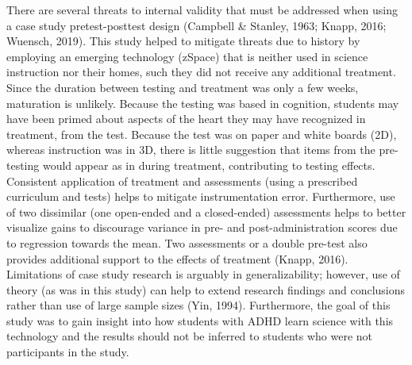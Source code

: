 \documentclass[11.5pt]{sig-alternate} %
\begin{document}
\begin{large}
There are several threats to internal validity that must be addressed when using a case study pretest-posttest design (Campbell \& Stanley, 1963; Knapp, 2016; Wuensch, 2019). This study helped to mitigate threats due to history by employing an emerging technology (zSpace) that is neither used in science instruction nor their homes, such they did not receive any additional treatment. Since the duration between testing and treatment was only a few weeks, maturation is unlikely. Because the testing was based in cognition, students may have been primed about aspects of the heart they may have recognized in treatment, from the test. Because the test was on paper and white boards (2D), whereas instruction was in 3D, there is little suggestion that items from the pre-testing would appear as in during treatment, contributing to testing effects. Consistent application of treatment and assessments (using a prescribed curriculum and tests) helps to mitigate instrumentation error.  Furthermore, use of two dissimilar (one open-ended and a closed-ended) assessments helps to better visualize gains to discourage variance in pre- and post-administration scores due to regression towards the mean. Two assessments or a double pre-test also provides additional support to the effects of treatment (Knapp, 2016). Limitations of case study research is arguably in generalizability; however, use of theory (as was in this study) can help to extend research findings and conclusions rather than use of large sample sizes (Yin, 1994). Furthermore, the goal of this study was to gain insight into how students with ADHD learn science with this technology and the results should not be inferred to students who were not participants in the study.


\end{large}
\end{document}

